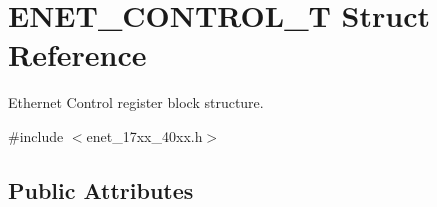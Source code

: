 \hypertarget{struct_e_n_e_t___c_o_n_t_r_o_l___t}{\section{E\+N\+E\+T\+\_\+\+C\+O\+N\+T\+R\+O\+L\+\_\+\+T Struct Reference}
\label{struct_e_n_e_t___c_o_n_t_r_o_l___t}
}


Ethernet Control register block structure.  




{\ttfamily \#include $<$enet\+\_\+17xx\+\_\+40xx.\+h$>$}

\subsection*{Public Attributes}
